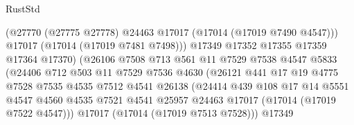 \begin{lexlean}{RustStd}
\begin{coremodule}
                                    (@27770
                                      (@27775 @27778)
                                      @24463
                                      @17017
                                      (@17014 (@17019 @7490 @4547)))
                                    @17017
                                    (@17014 (@17019 @7481 @7498)))
                                  @17349
                                  @17352
                                  @17355
                                  @17359
                                  @17364
                                  @17370)
                                (@26106
                                  @7508
                                  @713
                                  @561
                                  @11
                                  @7529
                                  @7538
                                  @4547
                                  @5833
                                  (@24406
                                    @712
                                    @503
                                    @11
                                    @7529
                                    @7536
                                    @4630
                                    (@26121
                                      @441
                                      @17
                                      @19
                                      @4775
                                      @7528
                                      @7535
                                      @4535
                                      @7512
                                      @4541
                                      @26138
                                      (@24414
                                        @439
                                        @108
                                        @17
                                        @14
                                        @5551
                                        @4547
                                        @4560
                                        @4535
                                        @7521
                                        @4541
                                        @25957
                                        @24463
                                        @17017
                                        (@17014 (@17019 @7522 @4547)))
                                      @17017
                                      (@17014 (@17019 @7513 @7528)))
                                    @17349

\end{coremodule}
\end{lexlean}
